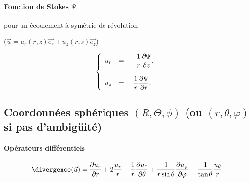 \paragraph{Fonction de Stokes $\Psi$}  pour un écoulement à symétrie de révolution

($\vec{u} = u_r(r,z) \vec{e_r} + u_z(r,z) \vec{e_z}$)


\begin{equation}
\left\{
\begin{array}{ccc}
\displaystyle u_r &=& \displaystyle - \frac{1}{r}\frac {\partial \Psi} {\partial z}, \\ \\
\displaystyle u_z &=& \displaystyle  \frac{1}{r}\frac {\partial \Psi} {\partial r}.
\end{array}
\right.
\end{equation}




\clearpage

\subsection{Coordonnées sphériques $(R,\Theta,\phi)$ (ou $(r,\theta,\varphi)$ si pas d'ambigüité) }

\paragraph{Opérateurs différentiels}

$$
\divergence(\vec{u})=\frac{\partial u_r}{\partial r} + 2 \frac{u_r}{r} + \frac{1}{r} \frac{\partial u_\theta}{\partial \theta} + \frac{1}{r \sin \theta} \frac{\partial u_\varphi}{\partial \varphi} + \frac{1}{\tan \theta} \frac{u_\theta}{r} 
$$


